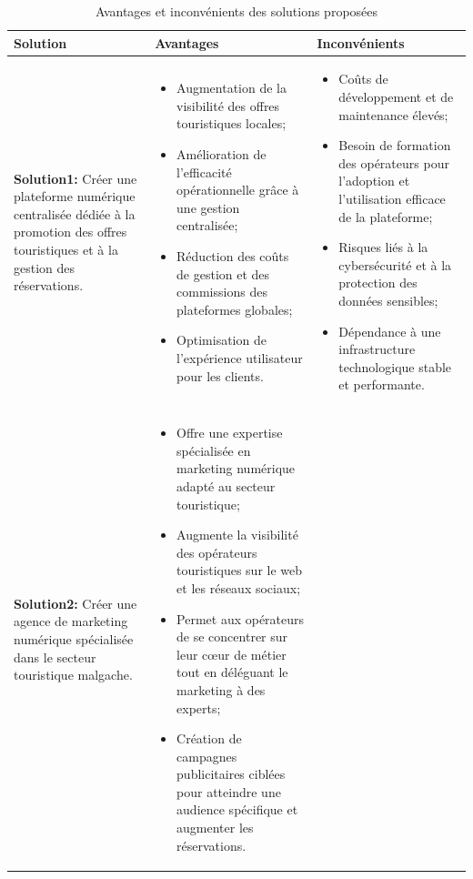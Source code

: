 \documentclass[12pt]{report}
\begin{document}
				\begin{longtable}{|p{5cm}|p{5cm}|p{5cm}|}
				  \caption{Avantages et inconvénients des solutions proposées}
				  \label{tab:solutions}\\
				      \hline
					     \textbf{Solution}  & \textbf{Avantages}  & \textbf{Inconvénients} \\
				      \hline		
				\endfirsthead
				\endhead
					\textbf{Solution1:}  Créer une plateforme numérique centralisée dédiée à la promotion des offres touristiques et à la gestion des réservations. &
					\begin{itemize}
						\item Augmentation de la visibilité des offres touristiques locales;
						\item Amélioration de l'efficacité opérationnelle grâce à une gestion centralisée;
						\item Réduction des coûts de gestion et des commissions des plateformes globales;
						\item Optimisation de l'expérience utilisateur pour les clients.
					\end{itemize}
					&
					\begin{itemize}
						\item Coûts de développement et de maintenance élevés;
						\item Besoin de formation des opérateurs pour l'adoption et l'utilisation efficace de la plateforme;
						\item Risques liés à la cybersécurité et à la protection des données sensibles;
						\item Dépendance à une infrastructure technologique stable et performante.
					\end{itemize}\\						
					\hline
					\textbf{Solution2:}  Créer une agence de marketing numérique spécialisée dans le secteur touristique malgache. &
					\begin{itemize}
						\item Offre une expertise spécialisée en marketing numérique adapté au secteur touristique;
						\item Augmente la visibilité des opérateurs touristiques sur le web et les réseaux sociaux;
						\item Permet aux opérateurs de se concentrer sur leur cœur de métier tout en déléguant le marketing à des experts;
						\item Création de campagnes publicitaires ciblées pour atteindre une audience spécifique et augmenter les réservations.

\end{itemize}
\end{longtable}
\end{document}
